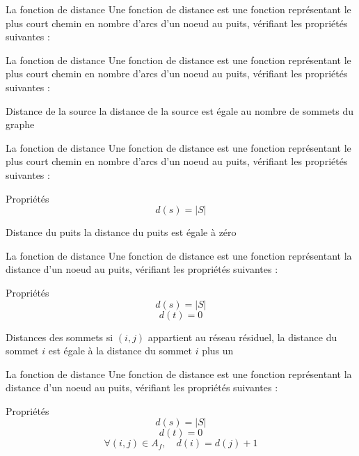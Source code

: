 \documentclass[hyperref={},
xcolor={dvipsnames,svgnames,table},10pt]{beamer}
\begin{document}
\begin{frame}{La fonction de distance}
	Une fonction de distance est une fonction représentant le plus court chemin en nombre d'arcs d'un
	noeud au puits, vérifiant les propriétés suivantes :\vfill
\end{frame}

\begin{frame}{La fonction de distance}
	Une fonction de distance est une fonction représentant le plus court chemin en nombre d'arcs d'un
	noeud au puits, vérifiant les propriétés suivantes : \vfill
	\begin{exampleblock}{Distance de la source}
		la distance de la source est égale au nombre de sommets du graphe
	\end{exampleblock} \vfill
\end{frame}

\begin{frame}{La fonction de distance}
	Une fonction de distance est une fonction représentant le plus court chemin en nombre d'arcs d'un
	noeud au puits, vérifiant les propriétés suivantes : \vfill
	\begin{block}{Propriétés}
		$$ d(s) = |S| $$
	\end{block} \vfill
	\begin{exampleblock}{Distance du puits}
		la distance du puits est égale à zéro
	\end{exampleblock} \vfill
\end{frame}

\begin{frame}{La fonction de distance}
	Une fonction de distance est une fonction représentant la distance d'un noeud au puits, vérifiant
	les propriétés suivantes : \vfill
	\begin{block}{Propriétés}
		$$ d(s) = |S| $$
		$$ d(t) = 0 $$
	\end{block} \vfill
	\begin{exampleblock}{Distances des sommets}
		si $(i,j)$ appartient au réseau résiduel, la distance du sommet $i$ est égale à la distance du sommet $i$ plus un
	\end{exampleblock}
\end{frame}

\begin{frame}{La fonction de distance}
	Une fonction de distance est une fonction représentant la distance d'un noeud au puits, vérifiant
	les propriétés suivantes : \vfill
	\begin{block}{Propriétés}
		$$ d(s) = |S| $$
		$$ d(t) = 0 $$
		$$ \forall (i,j) \in A_f,\quad d(i) = d(j) + 1 $$
	\end{block}
\end{frame}
\end{document}
